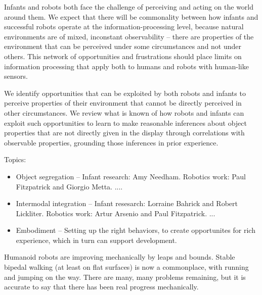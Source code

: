
Infants and robots both face the challenge of perceiving and acting on
the world around them.  
%
%
%
We expect
that there will be commonality between how infants and successful
robots operate at the information-processing level, because natural
environments are of mixed, inconstant observability -- there are
properties of the environment that can be perceived under some
circumstances and not under others.  This network of opportunities and
frustrations should place limits on information processing that apply
both to humans and robots with human-like sensors.

We identify opportunities that can be exploited by both robots and
infants to perceive properties of their environment that cannot be
directly perceived in other circumstances.  We review what is known of
how robots and infants can exploit such opportunities to learn to make
reasonable inferences 
%
%
about object properties that are not directly given in the display
%
through correlations
with observable properties, grounding those inferences in prior
experience.

Topics:

\begin{itemize}

\item Object segregation --
  Infant research: Amy Needham.
  Robotics work: Paul Fitzpatrick and Giorgio Metta. ....

\item Intermodal integration --
  Infant resesarch: Lorraine Bahrick and Robert Lickliter.
  Robotics work: Artur Arsenio and Paul Fitzpatrick. ...

\item Embodiment -- 
  Setting up the right behaviors, to create opportunites
  for rich experience, which in turn can support development.


\end{itemize}


Humanoid robots are improving mechanically by leaps and bounds.
Stable bipedal walking (at least on flat surfaces) is now a
commonplace, with running and jumping on the way.  There are
many, many problems remaining, but it is accurate to say that
there has been real progress mechanically.

